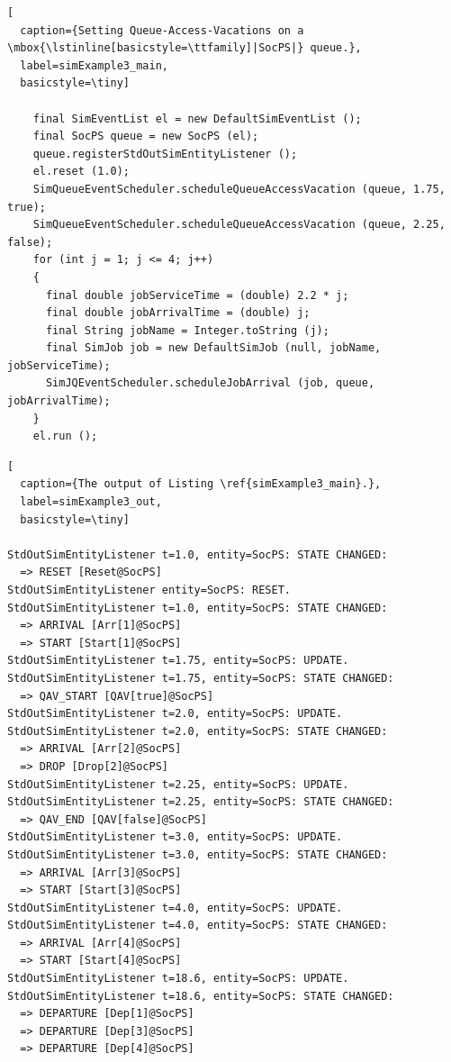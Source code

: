 \documentclass[12pt]{book}
\begin{document}
\begin{lstlisting}[
  caption={Setting Queue-Access-Vacations on a \mbox{\lstinline[basicstyle=\ttfamily]|SocPS|} queue.},
  label=simExample3_main,
  basicstyle=\tiny]

    final SimEventList el = new DefaultSimEventList ();
    final SocPS queue = new SocPS (el);
    queue.registerStdOutSimEntityListener ();
    el.reset (1.0);
    SimQueueEventScheduler.scheduleQueueAccessVacation (queue, 1.75, true);
    SimQueueEventScheduler.scheduleQueueAccessVacation (queue, 2.25, false);
    for (int j = 1; j <= 4; j++)
    {
      final double jobServiceTime = (double) 2.2 * j;
      final double jobArrivalTime = (double) j;
      final String jobName = Integer.toString (j);
      final SimJob job = new DefaultSimJob (null, jobName, jobServiceTime);
      SimJQEventScheduler.scheduleJobArrival (job, queue, jobArrivalTime);
    }
    el.run ();

\end{lstlisting}
  
\begin{lstlisting}[
  caption={The output of Listing \ref{simExample3_main}.},
  label=simExample3_out,
  basicstyle=\tiny]

StdOutSimEntityListener t=1.0, entity=SocPS: STATE CHANGED:
  => RESET [Reset@SocPS]
StdOutSimEntityListener entity=SocPS: RESET.
StdOutSimEntityListener t=1.0, entity=SocPS: STATE CHANGED:
  => ARRIVAL [Arr[1]@SocPS]
  => START [Start[1]@SocPS]
StdOutSimEntityListener t=1.75, entity=SocPS: UPDATE.
StdOutSimEntityListener t=1.75, entity=SocPS: STATE CHANGED:
  => QAV_START [QAV[true]@SocPS]
StdOutSimEntityListener t=2.0, entity=SocPS: UPDATE.
StdOutSimEntityListener t=2.0, entity=SocPS: STATE CHANGED:
  => ARRIVAL [Arr[2]@SocPS]
  => DROP [Drop[2]@SocPS]
StdOutSimEntityListener t=2.25, entity=SocPS: UPDATE.
StdOutSimEntityListener t=2.25, entity=SocPS: STATE CHANGED:
  => QAV_END [QAV[false]@SocPS]
StdOutSimEntityListener t=3.0, entity=SocPS: UPDATE.
StdOutSimEntityListener t=3.0, entity=SocPS: STATE CHANGED:
  => ARRIVAL [Arr[3]@SocPS]
  => START [Start[3]@SocPS]
StdOutSimEntityListener t=4.0, entity=SocPS: UPDATE.
StdOutSimEntityListener t=4.0, entity=SocPS: STATE CHANGED:
  => ARRIVAL [Arr[4]@SocPS]
  => START [Start[4]@SocPS]
StdOutSimEntityListener t=18.6, entity=SocPS: UPDATE.
StdOutSimEntityListener t=18.6, entity=SocPS: STATE CHANGED:
  => DEPARTURE [Dep[1]@SocPS]
  => DEPARTURE [Dep[3]@SocPS]
  => DEPARTURE [Dep[4]@SocPS]

\end{lstlisting}
\end{document}
